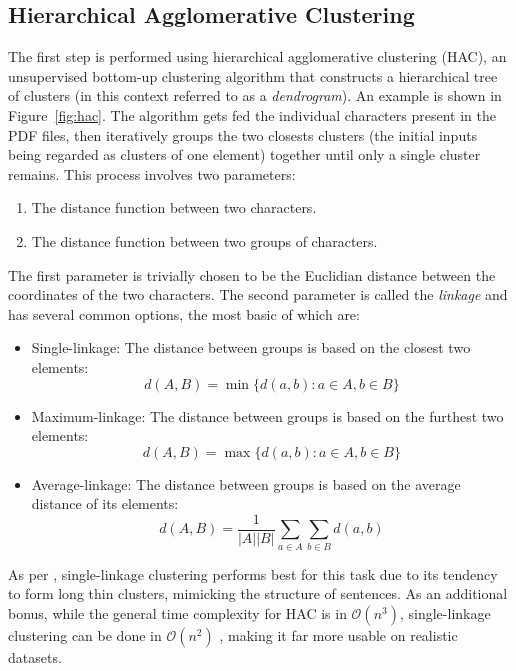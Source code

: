 \subsection{Hierarchical Agglomerative Clustering}
The first step is performed using hierarchical agglomerative clustering (HAC),
an unsupervised bottom-up clustering algorithm that constructs a hierarchical
tree of clusters (in this context referred to as a \emph{dendrogram}). An
example is shown in Figure~\ref{fig:hac}. The algorithm gets fed the individual
characters present in the PDF files, then iteratively groups the two closests
clusters (the initial inputs being regarded as clusters of one element) together
until only a single cluster remains. This process involves two parameters:
\begin{enumerate}
\item The distance function between two characters.
\item The distance function between two groups of characters.
\end{enumerate}
The first parameter is trivially chosen to be the Euclidian distance between the
coordinates of the two characters. The second parameter is called the
\emph{linkage} and has several common options, the most basic of which are:
\begin{itemize}
\item Single-linkage: The distance between groups is based on the closest two
  elements: \[ d(A, B) = \min \{ d(a, b) : a \in A, b \in B \} \]
\item Maximum-linkage: The distance between groups is based on the furthest two
  elements: \[ d(A, B) = \max \{ d(a, b) : a \in A, b \in B \} \]
\item Average-linkage: The distance between groups is based on the average
  distance of its elements:
  \[ d(A, B) = \frac{1}{|A||B|} \sum_{a \in A}\sum_{b \in B} d(a, b) \]
\end{itemize}
As per \textcite{klampfl2014unsupervised}, single-linkage clustering performs
best for this task due to its tendency to form long thin clusters, mimicking the
structure of sentences. As an additional bonus, while the general time
complexity for HAC is in $\mathcal{O}(n^3)$, single-linkage clustering can be
done in $\mathcal{O}(n^2)$ \citep{sibson1973slink}, making it far more usable on
realistic datasets.

